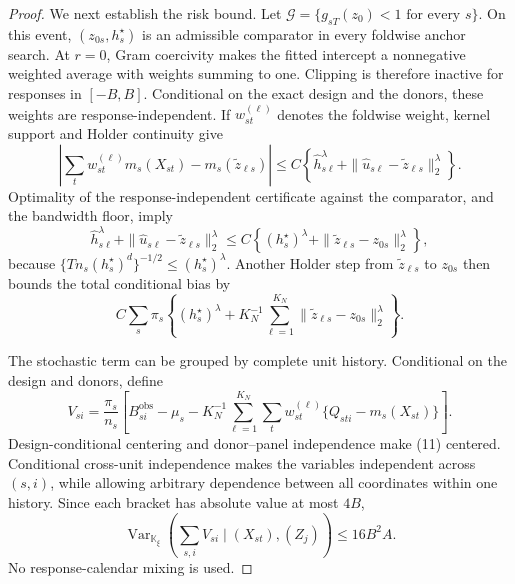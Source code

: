 \documentclass{article}
\begin{document}
\begin{proof}
We next establish the risk bound.  Let
\(\mathcal G=\{g_{sT}(z_0)<1\text{ for every }s\}\).  On this event,
\((z_{0s},h_s^\star)\) is an admissible comparator in every foldwise
anchor search.  At \(r=0\), Gram coercivity makes the fitted intercept a
nonnegative weighted average with weights summing to one.  Clipping is
therefore inactive for responses in \([-B,B]\).  Conditional on the exact
design and the donors, these weights are response-independent.  If
\(w_{st}^{(\ell)}\) denotes the foldwise weight, kernel support and Holder
continuity give
\[
 \left|\sum_tw_{st}^{(\ell)}m_s(X_{st})
       -m_s(\widetilde z_{\ell s})\right|
 \le C\left\{\widehat h_{s\ell}^{\lambda}
       +\|\widehat u_{s\ell}-\widetilde z_{\ell s}\|_2^\lambda\right\}.
                                                                    \tag{8}
\]
Optimality of the response-independent certificate against the comparator,
and the bandwidth floor, imply
\[
 \widehat h_{s\ell}^{\lambda}
 +\|\widehat u_{s\ell}-\widetilde z_{\ell s}\|_2^\lambda
 \le C\left\{(h_s^\star)^\lambda
       +\|\widetilde z_{\ell s}-z_{0s}\|_2^\lambda\right\},       \tag{9}
\]
because
\(\{Tn_s(h_s^\star)^d\}^{-1/2}\le(h_s^\star)^\lambda\).
Another Holder step from \(\widetilde z_{\ell s}\) to \(z_{0s}\) then
bounds the total conditional bias by
\[
 C\sum_s\pi_s\left\{(h_s^\star)^\lambda
 +K_N^{-1}\sum_{\ell=1}^{K_N}
   \|\widetilde z_{\ell s}-z_{0s}\|_2^\lambda\right\}.          \tag{10}
\]

The stochastic term can be grouped by complete unit history.  Conditional
on the design and donors, define
\[
 V_{si}=\frac{\pi_s}{n_s}\left[
 B_{si}^{\mathrm{obs}}-\mu_s
 -K_N^{-1}\sum_{\ell=1}^{K_N}\sum_t w_{st}^{(\ell)}
       \{Q_{sti}-m_s(X_{st})\}\right].                          \tag{11}
\]
Design-conditional centering and donor--panel independence make (11)
centered.  Conditional cross-unit independence makes the variables
independent across \((s,i)\), while allowing arbitrary dependence between
all coordinates within one history.  Since each bracket has absolute value
at most \(4B\),
\[
 \operatorname{Var}_{\mathbb K_\xi}
 \left(\sum_{s,i}V_{si}\mid(X_{st}),(Z_j)\right)
 \le16B^2A.                                                     \tag{12}
\]
No response-calendar mixing is used.


\end{proof}
\end{document}
